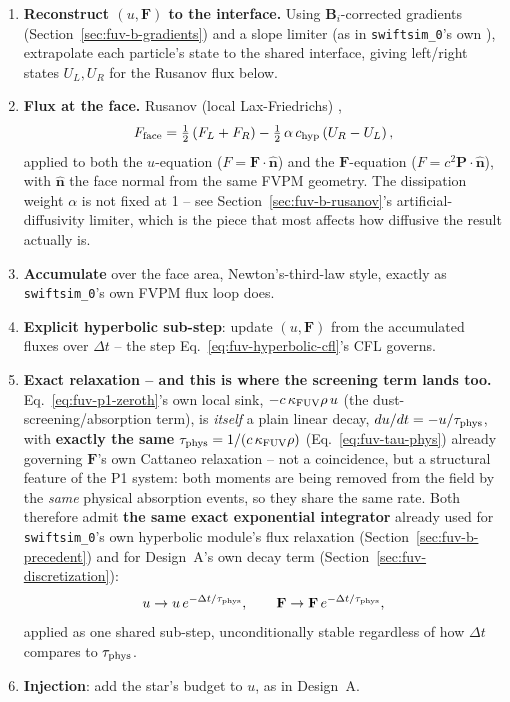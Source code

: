 \begin{enumerate}
  \item \textbf{Reconstruct $(u,\mathbf F)$ to the interface.} Using
    $\mathbf B_i$-corrected gradients (Section~\ref{sec:fuv-b-gradients})
    and a slope limiter (as in \texttt{swiftsim\_0}'s own
    ), extrapolate each
    particle's state to the shared interface, giving left/right states
    $U_L,U_R$ for the Rusanov flux below.
  \item \textbf{Flux at the face.} Rusanov (local Lax-Friedrichs)
    \citep{Rusanov1961},
    \begin{equation}
      F_{\rm face} = \tfrac12\left(F_L+F_R\right)
        - \tfrac12\,\alpha\,c_{\rm hyp}\left(U_R-U_L\right) ,
      \label{eq:fuv-rusanov-flux}
    \end{equation}
    applied to both the $u$-equation ($F=\mathbf F\cdot\hat{\mathbf n}$)
    and the $\mathbf F$-equation ($F=c^2\mathbf P\cdot\hat{\mathbf n}$),
    with $\hat{\mathbf n}$ the face normal from the same FVPM geometry.
    The dissipation weight $\alpha$ is not fixed at 1 -- see
    Section~\ref{sec:fuv-b-rusanov}'s artificial-diffusivity limiter,
    which is the piece that most affects how diffusive the result
    actually is.
  \item \textbf{Accumulate} over the face area, Newton's-third-law
    style, exactly as \texttt{swiftsim\_0}'s own FVPM flux loop does.
  \item \textbf{Explicit hyperbolic sub-step}: update $(u,\mathbf F)$
    from the accumulated fluxes over $\Delta t$ -- the step
    Eq.~\ref{eq:fuv-hyperbolic-cfl}'s CFL governs.
  \item \textbf{Exact relaxation -- and this is where the screening
    term lands too.} Eq.~\ref{eq:fuv-p1-zeroth}'s own local sink,
    $-c\,\kappa_{\rm FUV}\rho\,u$ (the dust-screening/absorption term),
    is \emph{itself} a plain linear decay, $du/dt=-u/\tau_{\rm phys}$,
    with \textbf{exactly the same} $\tau_{\rm phys}=1/(c\,\kappa_{\rm
    FUV}\rho)$ (Eq.~\ref{eq:fuv-tau-phys}) already governing
    $\mathbf F$'s own Cattaneo relaxation -- not a coincidence, but a
    structural feature of the P1 system: both moments are being removed
    from the field by the \emph{same} physical absorption events, so
    they share the same rate. Both therefore admit \textbf{the same
    exact exponential integrator} already used for
    \texttt{swiftsim\_0}'s own hyperbolic module's flux relaxation
    (Section~\ref{sec:fuv-b-precedent}) and for Design~A's own decay
    term (Section~\ref{sec:fuv-discretization}):
    \begin{equation}
      u \to u\,e^{-\Delta t/\tau_{\rm phys}} , \qquad
      \mathbf F \to \mathbf F\,e^{-\Delta t/\tau_{\rm phys}} ,
      \label{eq:fuv-b-joint-relax}
    \end{equation}
    applied as one shared sub-step, unconditionally stable regardless
    of how $\Delta t$ compares to $\tau_{\rm phys}$.
  \item \textbf{Injection}: add the star's budget to $u$, as in
    Design~A.
\end{enumerate}

